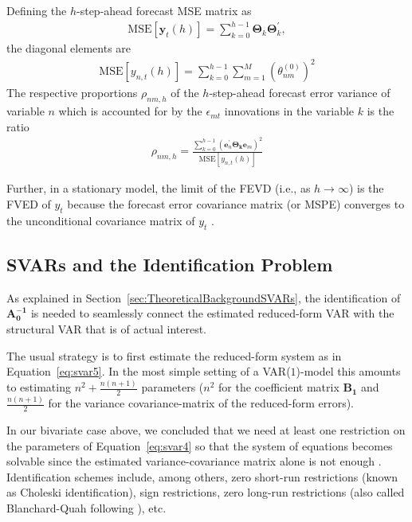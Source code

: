\documentclass[a4paper,11pt,listof=nochaptergap,oneside,pointednumbers,bibtotoc,bigheadings,liststotoc,hidelinks]{scrbook}
\theoremstyle{mysatz}
\theoremstyle{mydefinition}
\theoremstyle{mytheorem}
\theoremstyle{mybemerkung}
\newcommand{\vect}[1]{\boldsymbol{\mathbf{#1}}}
\begin{document}
Defining the $h$-step-ahead forecast MSE matrix as
\begin{equation} \label{eq:FVED4}
\begin{split}
 		\text{MSE}[\vect{y}_t(h)] = \sum\limits_{k=0}^{h-1} \vect{\Theta}_k\vect{\Theta}_k^',
\end{split}								
\end{equation}
the diagonal elements are
\begin{equation} \label{eq:FVED5}
\begin{split}
 		\text{MSE}[y_{n,t}(h)] = \sum\limits_{k=0}^{h-1}\sum\limits_{m=1}^{M}\left(\theta_{nm}^{(0)}\right)^2
\end{split}								
\end{equation}
The respective proportions $\rho_{nm,h}$ of the $h$-step-ahead forecast error variance of variable $n$ which is accounted for by the $\epsilon_{mt}$ innovations in the variable $k$ is the ratio
\begin{equation} \label{eq:FVED6}
\begin{split}
 		\rho_{nm,h} = \frac{\sum\limits_{k=0}^{h-1} (\vect{e}_n^'\vect{\Theta_k}\vect{e}_m)^2}{\text{MSE}[y_{n,t}(h)]}
\end{split}								
\end{equation}

Further, in a stationary model, the limit of the FEVD (i.e., as $h \rightarrow \infty$) is the FVED of $y_t$ because the forecast error covariance matrix (or MSPE) converges to the unconditional covariance matrix of $y_t$ \citep{lutkepohlkilian:17}. 


\subsection{SVARs and the Identification Problem}
\label{sec:strcuturalVARsIdentification}
As explained in Section~\ref{sec:TheoreticalBackgroundSVARs}, the identification of $\vect{A_0^{-1}}$ is needed to seamlessly connect the estimated reduced-form VAR with the structural VAR that is of actual interest.

The usual strategy is to first estimate the reduced-form system as in Equation~\ref{eq:svar5}. In the most simple setting of a VAR($1$)-model this amounts to estimating $n^2 + \frac{n(n+1)}{2}$ parameters ($n^2$ for the coefficient matrix $\vect{B_1}$ and $\frac{n(n+1)}{2}$ for the variance covariance-matrix of the reduced-form errors). 

In our bivariate case above, we concluded that we need at least one restriction on the parameters of Equation~\ref{eq:svar4} so that the system of equations becomes solvable since the estimated variance-covariance matrix alone is not enough \citep{ludvigsonetal:17}. Identification schemes include, among others, zero short-run restrictions (known as Choleski identification), sign restrictions, zero long-run restrictions (also called Blanchard-Quah following \citealp{blanchardandquah:89}), etc.
\end{document}
